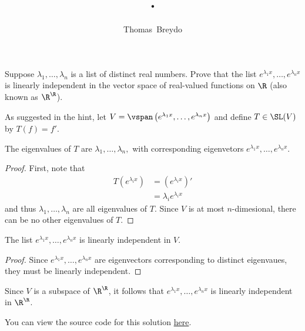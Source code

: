 \documentclass{amsart}
\title{\pagenum.\probnum}
\author{Thomas\ Breydo}
\newcommand{\pagenum}{142}
\newcommand{\probnum}{32}
\begin{document}
\maketitle

\begin{problem*}
Suppose $\lambda_1,\dots,\lambda_n$ is a list of distinct real numbers.
Prove that the list $e^{\lambda_1 x},\ldots,e^{\lambda_n x}$
is linearly independent in the vector space of real-valued
functions on $\R$ (also known as $\R^\R$).
\end{problem*}

\vspace{0.5in}

As suggested in the hint, let
$V=\vspan\left(e^{\lambda_1 x},\ldots,e^{\lambda_n x}\right)$
and define $T\in\SL(V)$ by $T(f)=f'.$

\begin{claim*}
The eigenvalues of $T$ are $\lambda_1,\ldots,\lambda_n,$ with
corresponding eigenvetors $e^{\lambda_1 x},\ldots,e^{\lambda_n x}.$
\end{claim*}
\begin{proof}
First, note that
\begin{align*}
    T\left(e^{\lambda_i x}\right)
    &= \left(e^{\lambda_i x}\right)' \\
    &=\lambda_i e^{\lambda_i x}
\end{align*}
and thus $\lambda_1,\ldots,\lambda_n$ are all eigenvalues of $T.$
Since $V$ is at most $n$-dimesional, there can be no other
eigenvalues of $T.$
\end{proof}

\begin{claim*}
The list $e^{\lambda_1 x},\ldots,e^{\lambda_n x}$ is linearly
independent in $V.$
\end{claim*}
\begin{proof}
Since $e^{\lambda_1x},\ldots,e^{\lambda_nx}$ are eigenvectors corresponding
to distinct eigenvaues, they must be linearly independent.
\end{proof}

Since $V$ is a subspace of $\R^\R$,
it follows that $e^{\lambda_1 x},\ldots,e^{\lambda_n x}$
is linearly independent in $\R^\R$.

\vspace{0.5in}

\begin{note*}
You can view the source code for this solution
\href{https://github.com/thomasbreydo/linalg/blob/main/\pagenum_\probnum_Thomas_Breydo.tex}
{here}.
\end{note*}
\end{document}
